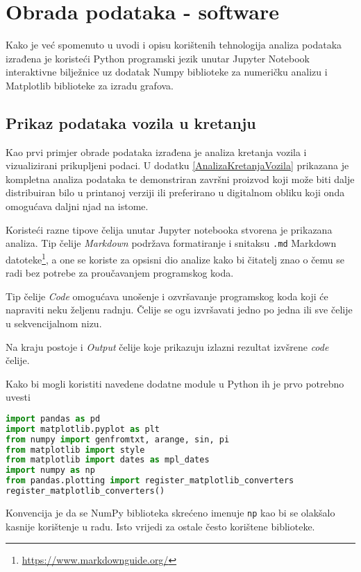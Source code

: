 \chapter{Obrada podataka - software}\label{ch:Software}
Kako je već spomenuto u uvodi i opisu korištenih tehnologija analiza podataka izrađena je koristeći Python programski jezik unutar Jupyter Notebook interaktivne bilježnice uz dodatak Numpy biblioteke za numeričku analizu i Matplotlib biblioteke za izradu grafova.

\section{Prikaz podataka vozila u kretanju}
Kao prvi primjer obrade podataka izrađena je analiza kretanja vozila i vizualizirani prikupljeni podaci.
U dodatku \ref{AnalizaKretanjaVozila} prikazana je kompletna analiza podataka te demonstriran završni proizvod koji može biti dalje distribuiran bilo u printanoj verziji ili preferirano u digitalnom obliku koji onda omogućava daljni njad na istome.

Koristeći razne tipove čelija unutar Jupyter notebooka stvorena je prikazana analiza.
Tip čelije \textit{Markdown} podržava formatiranje i snitaksu \texttt{.md} Markdown datoteke\footnote{\url{https://www.markdownguide.org/}}, a one se koriste za opsisni dio analize kako bi čitatelj znao o čemu se radi bez potrebe za proučavanjem programskog koda.

Tip čelije \textit{Code} omogućava unošenje i ozvršavanje programskog koda koji će napraviti neku željenu radnju.
Čelije se ogu izvršavati jedno po jedna ili sve čelije u sekvencijalnom nizu.

Na kraju postoje i \textit{Output} čelije koje prikazuju izlazni rezultat izvšrene \textit{code} čelije.

Kako bi mogli koristiti navedene dodatne module u Python ih je prvo potrebno uvesti
\begin{lstlisting}[language=Python]
import pandas as pd
import matplotlib.pyplot as plt
from numpy import genfromtxt, arange, sin, pi
from matplotlib import style
from matplotlib import dates as mpl_dates
import numpy as np
from pandas.plotting import register_matplotlib_converters
register_matplotlib_converters()
\end{lstlisting}

Konvencija je da se NumPy biblioteka skrećeno imenuje \texttt{np} kao bi se olakšalo kasnije korištenje u radu.
Isto vrijedi za ostale često korištene biblioteke.

